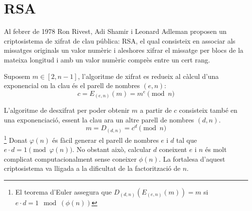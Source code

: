 \documentclass[journal]{IEEEtran}
\begin{document}
%





\section{RSA}
Al febrer de 1978 Ron Rivest, Adi Shamir i Leonard Adleman proposen un criptosistema de xifrat de clau pública: RSA, el qual consisteix en associar als missatges originals un valor numèric i aleshores xifrar el missatge per blocs de la mateixa longitud i amb un valor numèric comprès entre un cert rang.

Suposem $m \in [2, n-1]$, l'algoritme de xifrat es redueix al càlcul d'una exponencial on la clau és el parell de nombres $(e,n)$:
\[
c= E_{(e,n)} (m) = m^e \pmod n
\]

L'algoritme de desxifrat per poder obtenir $m$ a partir de $c$ consisteix també en una exponenciació, essent la clau ara un altre parell de nombres $(d,n)$.
\[
m= D_{(d,n)} = c^d \pmod n 
\]
\footnote{El teorema d'Euler assegura que $D_{(d,n)}(E_{(e,n)}(m))=m$ si $e\cdot d = 1 \mod (\phi(n))$}
Donat $\varphi (n) $ és fàcil generar el parell de nombres $e$ i $d$ tal que $e \cdot d = 1 \pmod {\varphi (n)}$. No obstant això,   calcular $d$ coneixent $e$ i $n$ és molt complicat computacionalment sense coneixer $\phi(n)$. La fortalesa d'aquest criptosistema va lligada a la dificultat de la factorització de $n$.
\end{document}
